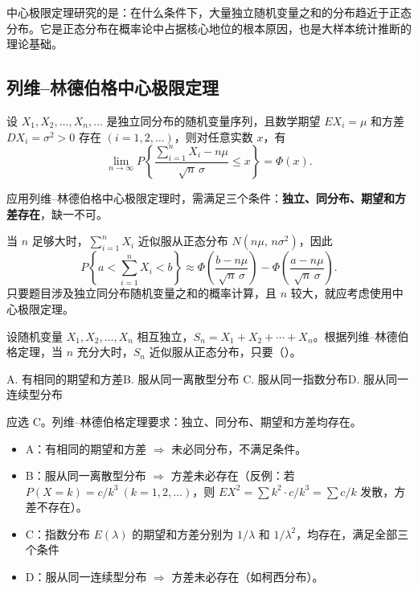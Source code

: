 \documentclass[lang=cn,11pt]{elegantbook}
\begin{document}
中心极限定理研究的是：在什么条件下，大量独立随机变量之和的分布趋近于正态分布。它是正态分布在概率论中占据核心地位的根本原因，也是大样本统计推断的理论基础。

\subsection{列维--林德伯格中心极限定理}

\begin{theorem}[列维--林德伯格中心极限定理] \label{thm:levy-lindberg}
设 \(X_1, X_2, \dots, X_n, \dots\) 是独立同分布的随机变量序列，且数学期望 \(EX_i = \mu\) 和方差 \(DX_i = \sigma^2 > 0\) 存在 \((i = 1, 2, \dots)\)，则对任意实数 \(x\)，有
\[
\lim_{n\to\infty} P\!\left\{\frac{\sum_{i=1}^{n} X_i - n\mu}{\sqrt{n}\,\sigma} \leq x\right\} = \Phi(x).
\]
\end{theorem}

\begin{note}
应用列维--林德伯格中心极限定理时，需满足三个条件：\textbf{独立、同分布、期望和方差存在}，缺一不可。

当 \(n\) 足够大时，\(\displaystyle\sum_{i=1}^{n} X_i\) 近似服从正态分布 \(N(n\mu,\, n\sigma^2)\)，因此
\[
P\!\left\{a < \sum_{i=1}^{n} X_i < b\right\} \approx \Phi\!\left(\frac{b - n\mu}{\sqrt{n}\,\sigma}\right) - \Phi\!\left(\frac{a - n\mu}{\sqrt{n}\,\sigma}\right).
\]
只要题目涉及独立同分布随机变量之和的概率计算，且 \(n\) 较大，就应考虑使用中心极限定理。
\end{note}

\begin{exercise}\label{exer:5-clt-condition}
设随机变量 \(X_1, X_2, \dots, X_n\) 相互独立，\(S_n = X_1 + X_2 + \cdots + X_n\)。根据列维--林德伯格定理，当 \(n\) 充分大时，\(S_n\) 近似服从正态分布，只要（\quad）。\par
A. 有相同的期望和方差\quad B. 服从同一离散型分布\quad
C. 服从同一指数分布\quad D. 服从同一连续型分布
\end{exercise}

\begin{solution}
应选 C。列维--林德伯格定理要求：独立、同分布、期望和方差均存在。
\begin{itemize}
    \item A：有相同的期望和方差 \(\Rightarrow\) 未必同分布，不满足条件。
    \item B：服从同一离散型分布 \(\Rightarrow\) 方差未必存在（反例：若 \(P(X=k)=c/k^3\ (k=1,2,\dots)\)，则 \(EX^2=\sum k^2\cdot c/k^3=\sum c/k\) 发散，方差不存在）。
    \item C：指数分布 \(E(\lambda)\) 的期望和方差分别为 \(1/\lambda\) 和 \(1/\lambda^2\)，均存在，满足全部三个条件 \checkmark
    \item D：服从同一连续型分布 \(\Rightarrow\) 方差未必存在（如柯西分布）。
\end{itemize}
\end{solution}
\end{document}
